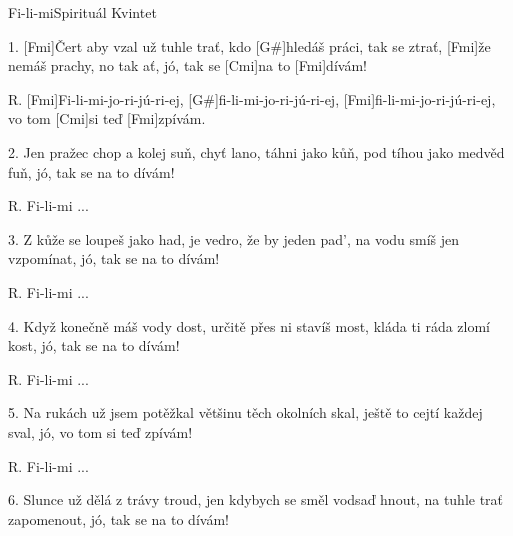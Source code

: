 \begin{song}{Fi-li-mi}{Spirituál Kvintet}


\begin{xverse}{1. }
[Fmi]{Čert} aby vzal už tuhle trať, kdo [G#]hledáš práci, tak se ztrať,
[Fmi]{že} nemáš prachy, no tak ať, jó, tak se [Cmi]na to [Fmi]dívám!
\end{xverse}

\begin{xverse}{R. }
[Fmi]Fi-li-mi-jo-ri-jú-ri-ej,  [G#]fi-li-mi-jo-ri-jú-ri-ej,
[Fmi]fi-li-mi-jo-ri-jú-ri-ej, vo tom [Cmi]si teď [Fmi]zpívám.
\end{xverse}

\begin{xverse}{2. }
Jen pražec chop a kolej suň, chyť lano, táhni jako kůň,
pod tíhou jako medvěd fuň, jó, tak se na to dívám!
\end{xverse}

\begin{xverse}{R. }
Fi-li-mi ...
\end{xverse}

\begin{xverse}{3. }
Z kůže se loupeš jako had, je vedro, že by jeden pad',
na vodu smíš jen vzpomínat, jó, tak se na to dívám!
\end{xverse}

\begin{xverse}{R. }
Fi-li-mi ...
\end{xverse}

\begin{xverse}{4. }
Když konečně máš vody dost, určitě přes ni stavíš most,
kláda ti ráda zlomí kost, jó, tak se na to dívám!
\end{xverse}

\begin{xverse}{R. }
Fi-li-mi ...
\end{xverse}

\begin{xverse}{5. }
Na rukách už jsem potěžkal většinu těch okolních skal,
ještě to cejtí každej sval, jó, vo tom si teď zpívám!
\end{xverse}

\begin{xverse}{R. }
Fi-li-mi ...
\end{xverse}

\begin{xverse}{6. }
Slunce už dělá z trávy troud,
jen kdybych se směl vodsaď hnout,
na tuhle trať zapomenout, jó, tak se na to dívám!
\end{xverse}


\end{song}
